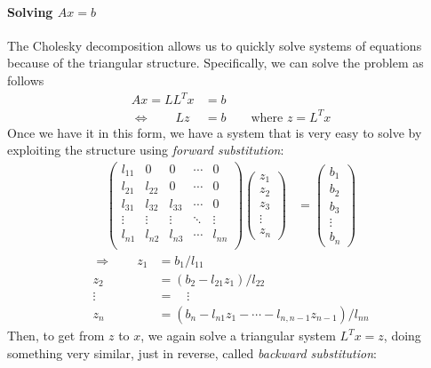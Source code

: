 \documentclass[12pt]{article}
\numberwithin{equation}{section} %
\theoremstyle{plain}
\theoremstyle{definition}
\theoremstyle{remark}
\begin{document}
\paragraph{Solving $Ax=b$} The Cholesky decomposition allows us to
quickly solve systems of equations because of the triangular
structure. Specifically, we can solve the problem as follows
\begin{align*}
  Ax = LL^Tx&=b\\
  \Leftrightarrow \quad \quad Lz&=b \qquad \text{where }z = L^T x
\end{align*}
Once we have it in this form, we have a system that is very easy to
solve by exploiting the structure using \emph{forward substitution}:
\begin{align*}
  \begin{pmatrix}
    l_{11} & 0      & 0 & \cdots & 0 \\
    l_{21} & l_{22} & 0 & \cdots & 0\\
    l_{31} & l_{32} & l_{33}& \cdots & 0\\
    \vdots & \vdots & \vdots & \ddots & \vdots\\
    l_{n1} & l_{n2} & l_{n3} &\cdots & l_{nn}\\
  \end{pmatrix}
  \begin{pmatrix}
    z_1 \\ z_2 \\ z_3 \\ \vdots \\ z_n
  \end{pmatrix}
  &=
  \begin{pmatrix}
    b_1 \\ b_2 \\ b_3 \\ \vdots \\ b_n
  \end{pmatrix}
\end{align*}
\begin{align*}
  \Rightarrow \qquad
  z_1 &= b_1/l_{11} \\
  z_2 &= (b_2 - l_{21}z_1)/l_{22} \\
  \vdots \; &= \quad \vdots\\
  z_n &= (b_n - l_{n1}z_1 - \cdots - l_{n,n-1}z_{n-1})/l_{nn}
\end{align*}
Then, to get from $z$ to $x$, we again solve a triangular system $L^Tx =
z$, doing something very similar, just in reverse, called \emph{backward
substitution}:
\end{document}
